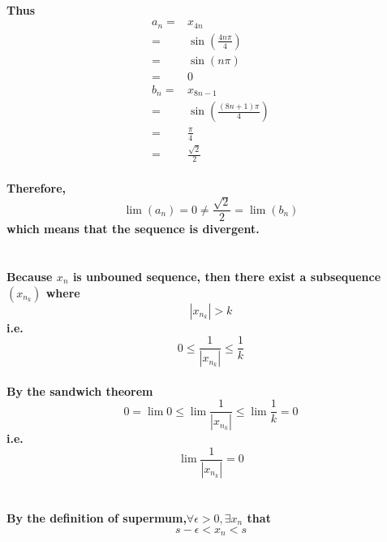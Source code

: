 \documentclass{article}
\begin{document}
        \paragraph{
            Thus
            \begin{equation*}
                \begin{split}
                    a_n=&x_{4n}\\
                        =&\sin(\frac{4n\pi}{4})\\
                        =&\sin(n\pi)\\
                        =&0\\
                    b_n=&x_{8n-1}\\
                        =&\sin (\frac{(8n+1)\pi}{4})\\
                        =&\frac{\pi}{4}\\
                        =&\frac{\sqrt{2}}{2}
                \end{split}
            \end{equation*}
        }
        \paragraph{
            Therefore,
            $$\lim (a_n)=0\neq\frac{\sqrt{2}}{2}=\lim (b_n)$$
            which means that the sequence is divergent.
        }
    \section{}
        \paragraph{
            Because $x_n$ is unbouned sequence, then there exist a subsequence $(x_{n_k})$
            where
            $$|x_{n_k}| > k$$
            i.e.
            $$0\leq \frac{1}{|x_{n_k}|}\leq \frac{1}{k}$$
        }
        \paragraph{
            By the sandwich theorem
            $$0= \lim 0 \leq \lim \frac{1}{|x_{n_k}|} \leq \lim \frac{1}{k}=0 $$
            i.e.
            $$\lim \frac{1}{|x_{n_k}|}=0$$
        }
    
    \section{}
        \paragraph{
            By the definition of supermum,$\forall \epsilon>0,\exists x_n$ that 
            $$s-\epsilon<x_n<s$$
        }
\end{document}

